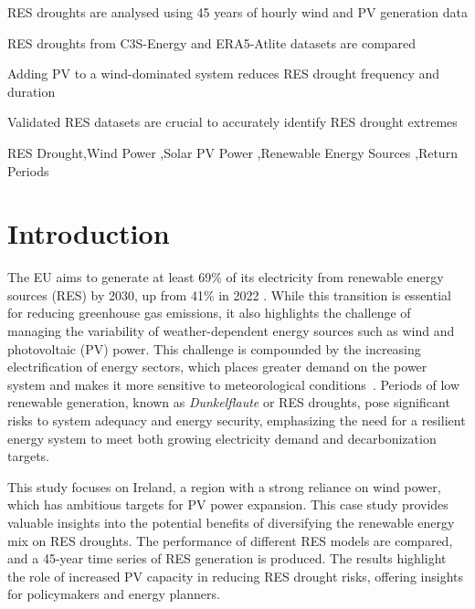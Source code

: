 \documentclass[preprint, 12pt, authoryear]{elsarticle}
\begin{document}
\begin{frontmatter}
\begin{highlights}
\item RES droughts are analysed using 45 years of hourly wind and PV generation data

\item RES droughts from C3S-Energy and ERA5-Atlite datasets are compared

\item Adding PV to a wind-dominated system reduces RES drought frequency and duration

\item Validated RES datasets are crucial to accurately identify RES drought extremes

\end{highlights}

\begin{keyword}
RES Drought\sep Wind Power \sep Solar PV Power \sep Renewable Energy Sources \sep Return Periods

\end{keyword}

\end{frontmatter}

\linenumbers

\section{Introduction}
\label{sec:Intro}

The EU aims to generate at least 69\% of its electricity from renewable energy sources (RES) by 2030, up from 41\% in 2022 \citep{eurostat2023share}. While this transition is essential for reducing greenhouse gas emissions, it also highlights the challenge of managing the variability of weather-dependent energy sources such as wind and photovoltaic (PV) power. This challenge is compounded by the increasing electrification of energy sectors, which places greater demand on the power system and makes it more sensitive to meteorological conditions~\citep{bloomfield2016, bloomfield2021, vanderwiel2019drought}. Periods of low renewable generation, known as \textit{Dunkelflaute} or RES droughts, pose significant risks to system adequacy and energy security, emphasizing the need for a resilient energy system to meet both growing electricity demand and decarbonization targets.

This study focuses on Ireland, a region with a strong reliance on wind power, which has ambitious targets for PV power expansion. This case study provides valuable insights into the potential benefits of diversifying the renewable energy mix on RES droughts. The performance of different RES models are compared, and a 45-year time series of RES generation is produced. The results highlight the role of increased PV capacity in reducing RES drought risks, offering insights for policymakers and energy planners.
\end{document}
